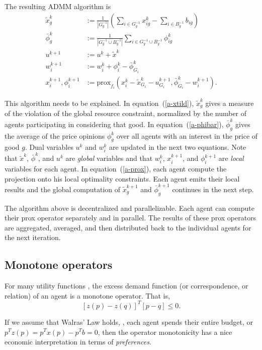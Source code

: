 \documentclass{article}
\begin{document}
The resulting ADMM algorithm is 
\begin{align}
\label{a-xtild}
\tilde{x}^k_g &:= \frac{1}{|G^{-1}_g|} \left( \sum_{i \in G^{-1}_g} x^k_{ig} - \sum_{i \in B^{-1}_g} b_{ig}\right)\\
\label{a-phibar}
\bar{\phi}^k_g &:= \frac{1}{ |G^{-1}_g \cup B^{-1}_g| } \sum_{i \in G^{-1}_g \cup B^{-1}_g}\phi^k_{ig}\\
u^{k+1} &:= u^k + \tilde{x}^k\\
w_i^{k+1} &:= w_i^k + \phi^k_i - \bar{\phi}^k_{G_i}\\
\label{a-prox}
x_i^{k+1}, \phi_i^{k+1} &:= \mbox{prox}_{f_i}(x_i^k - \tilde{x}^k_{G_i} - u^{k+1}_{G_i},
\bar{\phi}^k_{G_i} - w_i^{k+1}).
\end{align}

This algorithm needs to be explained.
In equation~(\ref{a-xtild}), $\tilde{x}^k_g$ gives a measure of the violation of
the global resource constraint, normalized by the number of agents participating
in considering that good.
In equation~(\ref{a-phibar}), $\bar{\phi}^k_g$ gives the average of the price
opinions $\phi^k_g$ over all agents with an interest in the price of good $g$.
Dual variables $u^k$ and $w^k_i$ are updated in the next two equations.
Note that $\tilde{x}^k$, $\bar{\phi}^k$, and $u^k$ are \emph{global} variables
and that $w_i^k$, $x_i^{k+1}$, and $\phi_i^{k+1}$ are \emph{local} variables
for each agent. In equation~(\ref{a-prox}), each agent compute the projection
onto his local optimality constraints. Each agent emits their local results and the
global computation of $\tilde{x}^{k+1}_g$ and $\bar{\phi}^{k+1}_g$ continues in the next
step.

The algorithm above is decentralized and parallelizable.
Each agent can compute their prox operator separately and in parallel.
The results of these prox operators are aggregated, averaged, and then distributed
back to the individual agents for the next iteration.

\subsection{Monotone operators}
For many utility functions , the excess demand function (or correspondence,
or relation) of an agent is a
monotone operator.
That is,
\begin{equation}
\label{e-monotone}
\left[z(p) - z(q) \right]^T \left[p - q\right] \leq 0.
\end{equation}

If we assume that Walras' Law holds, \ie, each agent spends their entire
budget, or $p^T z(p) = p^T x(p) - p^T b = 0$, then the operator monotonicity has
a nice economic interpretation in terms of \emph{preferences}.
\end{document}
